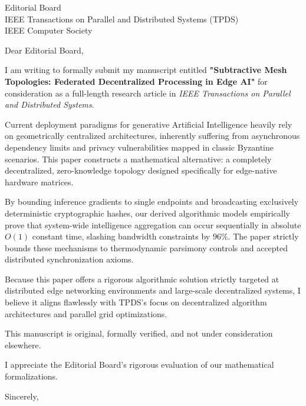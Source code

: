 \documentclass[11pt,a4paper]{letter}
\begin{document}
\begin{letter}{Editorial Board \\ IEEE Transactions on Parallel and Distributed Systems (TPDS) \\ IEEE Computer Society}

\opening{Dear Editorial Board,}

I am writing to formally submit my manuscript entitled \textbf{"Subtractive Mesh Topologies: Federated Decentralized Processing in Edge AI"} for consideration as a full-length research article in \textit{IEEE Transactions on Parallel and Distributed Systems}.

Current deployment paradigms for generative Artificial Intelligence heavily rely on geometrically centralized architectures, inherently suffering from asynchronous dependency limits and privacy vulnerabilities mapped in classic Byzantine scenarios. This paper constructs a mathematical alternative: a completely decentralized, zero-knowledge topology designed specifically for edge-native hardware matrices. 

By bounding inference gradients to single endpoints and broadcasting exclusively deterministic cryptographic hashes, our derived algorithmic models empirically prove that system-wide intelligence aggregation can occur sequentially in absolute \(O(1)\) constant time, slashing bandwidth constraints by \(96\%\). The paper strictly bounds these mechanisms to thermodynamic parsimony controls and accepted distributed synchronization axioms.

Because this paper offers a rigorous algorithmic solution strictly targeted at distributed edge networking environments and large-scale decentralized systems, I believe it aligns flawlessly with TPDS's focus on decentralized algorithm architectures and parallel grid optimizations.

This manuscript is original, formally verified, and not under consideration elsewhere.

I appreciate the Editorial Board’s rigorous evaluation of our mathematical formalizations.

\closing{Sincerely,}

\end{letter}
\end{document}
